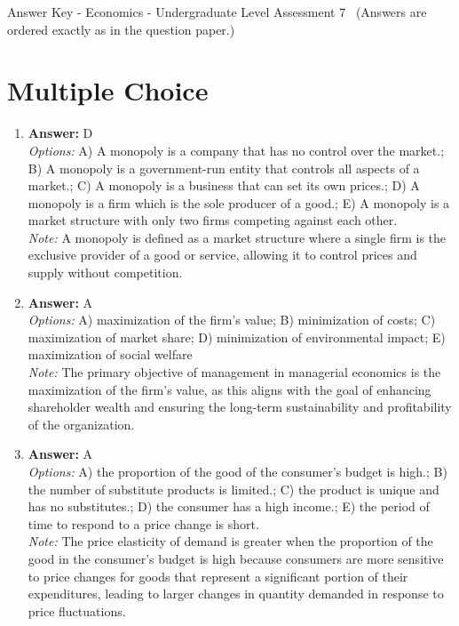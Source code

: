\documentclass[12pt]{article}
\begin{document}
\begin{center}
Answer Key - Economics - Undergraduate Level Assessment 7 \
\small (Answers are ordered exactly as in the question paper.)
\end{center}

\section*{Multiple Choice}
\begin{enumerate}[label=\arabic*.]
\item \textbf{Answer:} D
\\ \textit{Options:} A) A monopoly is a company that has no control over the market.; B) A monopoly is a government-run entity that controls all aspects of a market.; C) A monopoly is a business that can set its own prices.; D) A monopoly is a firm which is the sole producer of a good.; E) A monopoly is a market structure with only two firms competing against each other.
\\ \textit{Note:} A monopoly is defined as a market structure where a single firm is the exclusive provider of a good or service, allowing it to control prices and supply without competition.
\item \textbf{Answer:} A
\\ \textit{Options:} A) maximization of the firm's value; B) minimization of costs; C) maximization of market share; D) minimization of environmental impact; E) maximization of social welfare
\\ \textit{Note:} The primary objective of management in managerial economics is the maximization of the firm's value, as this aligns with the goal of enhancing shareholder wealth and ensuring the long-term sustainability and profitability of the organization.
\item \textbf{Answer:} A
\\ \textit{Options:} A) the proportion of the good of the consumer's budget is high.; B) the number of substitute products is limited.; C) the product is unique and has no substitutes.; D) the consumer has a high income.; E) the period of time to respond to a price change is short.
\\ \textit{Note:} The price elasticity of demand is greater when the proportion of the good in the consumer's budget is high because consumers are more sensitive to price changes for goods that represent a significant portion of their expenditures, leading to larger changes in quantity demanded in response to price fluctuations.

\end{enumerate}
\end{document}
